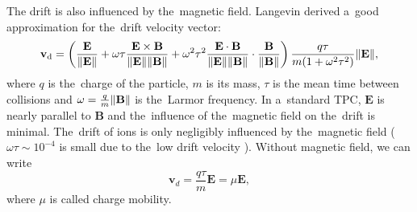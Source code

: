 			The drift is also influenced by the~magnetic field. Langevin derived a~good approximation for the~drift velocity vector:
				\begin{equation}
					\label{eq:drift}
					\mathbf{v}_\text{d} = \left(\frac{\mathbf{E}}{\norm{\mathbf{E}}} + \omega\tau\frac{\mathbf{E}\times\mathbf{B}}{\norm{\mathbf{E}}\norm{\mathbf{B}}} + \omega^2\tau^2\frac{\mathbf{E}\cdot\mathbf{B}}{\norm{\mathbf{E}}\norm{\mathbf{B}}}\cdot \frac{\mathbf{B}}{\norm{\mathbf{B}}}\right) \frac{q\tau}{m(1+\omega^2\tau^2)}\norm{\mathbf{E}},
				\end{equation}
			where $q$ is the~charge of the particle, $m$ is its mass, $\tau$ is the mean time between collisions and $\omega = \frac{q}{m}\norm{\mathbf{B}}$ is the~Larmor frequency. In a~standard \ac{TPC}, $\mathbf{E}$ is nearly parallel to $\mathbf{B}$ and the~influence of the~magnetic field on the~drift is minimal. The~drift of ions is only negligibly influenced by the~magnetic field ($\omega\tau\sim10^{-4}$ is small due to the~low drift velocity ).  Without magnetic field, we can write
				\begin{equation}
					\mathbf{v}_d = \frac{q\tau}{m} \mathbf{E} = \mu \mathbf{E},
				\end{equation}
			where $\mu$ is called charge mobility.
			
